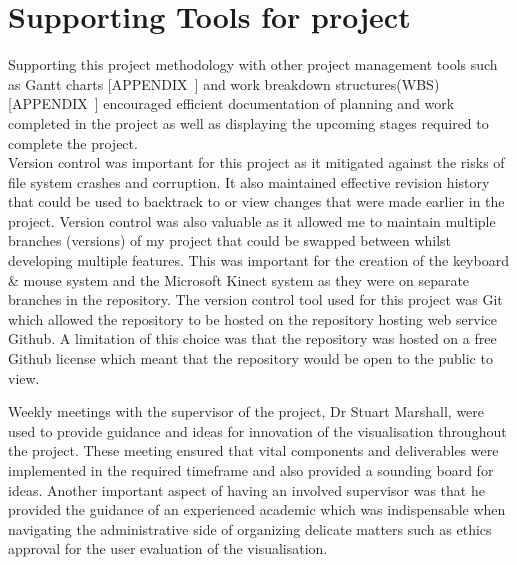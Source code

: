 \section{Supporting Tools for project}
Supporting this project methodology with other project management tools such
as Gantt charts [APPENDIX~] and work breakdown structures(WBS) [APPENDIX~]
encouraged efficient documentation of planning and work completed in the project
as well as displaying the upcoming stages required to complete the project.
\\

Version control was important for this project as it mitigated against the risks
of file system crashes and corruption. It also maintained effective revision
history that could be used to backtrack to or view changes that were made
earlier in the project. Version control was also valuable as it allowed me to
maintain multiple branches (versions) of my project that could be swapped between whilst developing multiple features.
This was important for the creation of the keyboard \& mouse system and the
Microsoft Kinect system as they were on separate branches in the repository. 
The version control tool used for this project was Git which allowed
 the repository to be hosted on the repository hosting web service Github. A
limitation of this choice was that the repository was hosted on a free Github license which meant that the
repository would be open to the public to view.

Weekly meetings with the supervisor of the project, Dr Stuart Marshall, were
used to provide guidance and ideas for innovation of the visualisation
throughout the project. These meeting ensured that vital components and
deliverables were implemented in the required timeframe and also provided a
sounding board for ideas.
Another important aspect of having an involved supervisor was that he provided the guidance of an experienced academic which was indispensable when
navigating the administrative side of organizing delicate matters such as ethics
approval for the user evaluation of the visualisation.

